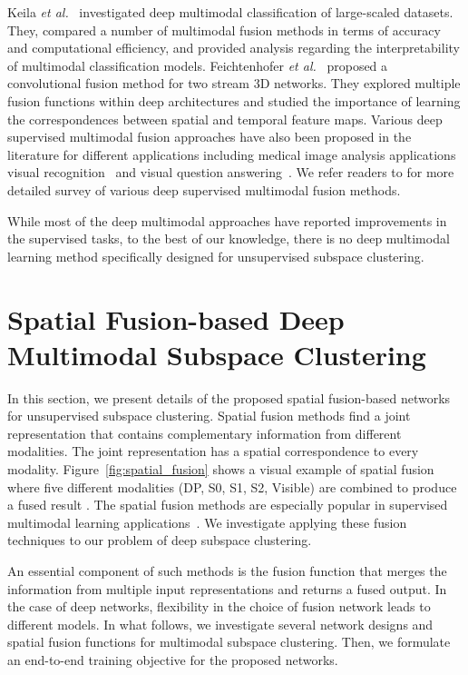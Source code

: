 \documentclass[journal]{IEEEtran}
\newcommand{\etal}{\textit{et al.}}
\begin{document}
Keila \etal~\cite{kiela2018efficient} investigated deep multimodal classification of large-scaled datasets.   They,  compared a number of multimodal fusion methods in terms of accuracy and computational efficiency, and provided analysis regarding the  interpretability of multimodal classification models. Feichtenhofer \etal~\cite{feichtenhofer2016convolutional} proposed a convolutional fusion method for two stream 3D networks.  They explored multiple fusion functions within deep architectures and studied the importance of learning the correspondences between spatial and temporal feature maps.  Various deep supervised multimodal fusion approaches have also been proposed in the literature for different applications including medical image analysis applications~\cite{simonovsky2016deep,liu2015multimodal}   visual recognition~\cite{jain2014modeep,kahou2016emonets} and   visual question answering~\cite{kim2016multimodal,antol2015vqa}. We refer readers to \cite{ramachandram2017deep} for more detailed survey of various  deep supervised multimodal fusion methods.
	
	 



While most of the deep multimodal approaches have reported improvements in the supervised tasks, to the best of our knowledge, there is no deep multimodal learning method specifically designed for unsupervised subspace clustering.	 




\section{Spatial Fusion-based Deep Multimodal Subspace Clustering}\label{sec:method}
In this section, we present details of the proposed spatial fusion-based networks for unsupervised subspace clustering.  Spatial fusion methods find a joint representation that contains complementary information from different modalities.  The joint representation has a spatial correspondence to every modality.  Figure~\ref{fig:spatial_fusion} shows a visual example of spatial fusion where five different modalities (DP, S0, S1, S2, Visible) are combined to produce a fused result .  The spatial fusion methods are especially popular in supervised multimodal learning applications~\cite{kiela2018efficient, feichtenhofer2016convolutional}. We investigate applying these fusion techniques to our problem of deep subspace clustering.		

An essential component of such methods is the fusion function that merges the information from multiple input representations and returns a fused output. In the case of deep networks,  flexibility in the choice of fusion network leads to different models.  In what follows, we investigate several network designs and spatial fusion functions for multimodal subspace clustering. Then, we formulate an end-to-end training objective for the proposed networks.
\end{document}
